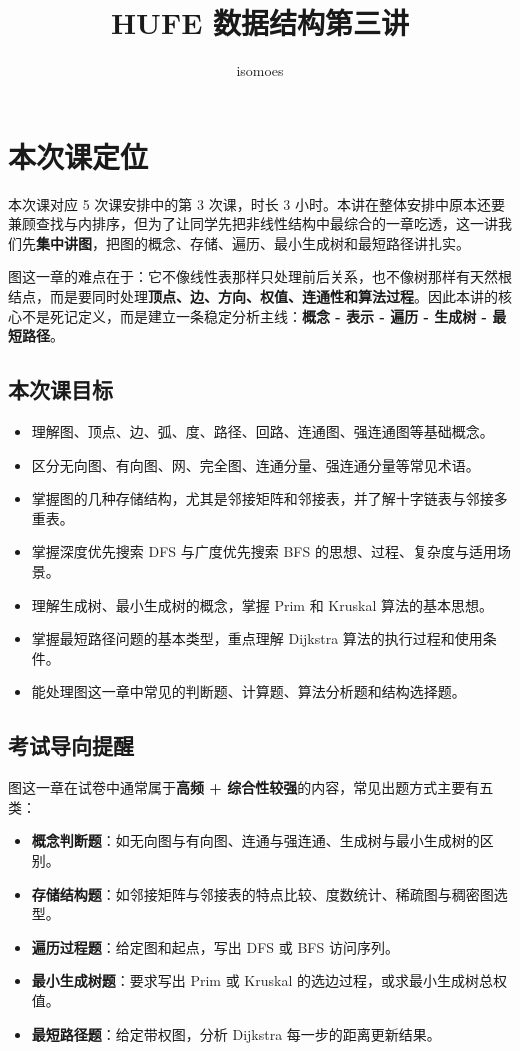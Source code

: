 \documentclass{../../note}
\title{HUFE 数据结构第三讲}
\author{isomoes}
\begin{document}
\maketitle

\section{本次课定位}

本次课对应 5 次课安排中的第 3 次课，时长 3 小时。本讲在整体安排中原本还要兼顾查找与内排序，但为了让同学先把非线性结构中最综合的一章吃透，这一讲我们先\textbf{集中讲图}，把图的概念、存储、遍历、最小生成树和最短路径讲扎实。

图这一章的难点在于：它不像线性表那样只处理前后关系，也不像树那样有天然根结点，而是要同时处理\textbf{顶点、边、方向、权值、连通性和算法过程}。因此本讲的核心不是死记定义，而是建立一条稳定分析主线：\textbf{概念 - 表示 - 遍历 - 生成树 - 最短路径}。

\subsection{本次课目标}

\begin{itemize}
  \item 理解图、顶点、边、弧、度、路径、回路、连通图、强连通图等基础概念。
  \item 区分无向图、有向图、网、完全图、连通分量、强连通分量等常见术语。
  \item 掌握图的几种存储结构，尤其是邻接矩阵和邻接表，并了解十字链表与邻接多重表。
  \item 掌握深度优先搜索 DFS 与广度优先搜索 BFS 的思想、过程、复杂度与适用场景。
  \item 理解生成树、最小生成树的概念，掌握 Prim 和 Kruskal 算法的基本思想。
  \item 掌握最短路径问题的基本类型，重点理解 Dijkstra 算法的执行过程和使用条件。
  \item 能处理图这一章中常见的判断题、计算题、算法分析题和结构选择题。
\end{itemize}

\subsection{考试导向提醒}

图这一章在试卷中通常属于\textbf{高频 + 综合性较强}的内容，常见出题方式主要有五类：

\begin{itemize}
  \item \textbf{概念判断题}：如无向图与有向图、连通与强连通、生成树与最小生成树的区别。
  \item \textbf{存储结构题}：如邻接矩阵与邻接表的特点比较、度数统计、稀疏图与稠密图选型。
  \item \textbf{遍历过程题}：给定图和起点，写出 DFS 或 BFS 访问序列。
  \item \textbf{最小生成树题}：要求写出 Prim 或 Kruskal 的选边过程，或求最小生成树总权值。
  \item \textbf{最短路径题}：给定带权图，分析 Dijkstra 每一步的距离更新结果。
\end{itemize}
\end{document}
